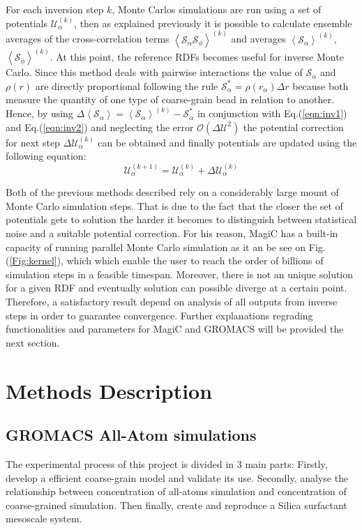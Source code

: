 \documentclass[10pt,a4paper,twoside]{article}
\begin{document}
For each inversion step $k$, Monte Carlos simulations are run using a set of potentials $\mathcal{U}_{\alpha}^{(k)}$, then as explained previously it is possible to calculate ensemble averages of the cross-correlation terms ${\left\langle\mathcal{S}_\alpha\mathcal{S}_\phi\right\rangle}^{(k)}$ and averages $\left\langle\mathcal{S}_\alpha\right\rangle^{(k)}$, $\left\langle\mathcal{S}_\phi\right\rangle^{(k)}$. At this point, the reference RDFs becomes useful for inverse Monte Carlo. Since this method deals with pairwise interactions the value of $\mathcal{S}_\alpha$ and $\rho(r)$ are directly proportional following the rule $\mathcal{S}_\alpha^{*}= \rho(r_\alpha)\Delta r $ \cite{magic} because both measure the quantity of one type of coarse-grain bead in relation to another. Hence, by using $\Delta\left\langle\mathcal{S}_\alpha\right\rangle = \left\langle\mathcal{S}_\alpha\right\rangle^{(k)} - \mathcal{S}_\alpha^{*}$  in conjunction with Eq.(\ref{eqn:inv1}) and Eq.(\ref{eqn:inv2}) and neglecting the error $\mathcal{O}({\Delta\mathcal{U}}^2)$ the potential correction for next step $\Delta\mathcal{U}_\alpha^{(k)}$ can be obtained and finally potentials are updated using the following  equation:
 \begin{equation}
\mathcal{U}_\alpha^{(k+1)}= \mathcal{U}_\alpha^{(k)}+\Delta\mathcal{U}_\alpha^{(k)}
\label{eqn:potup}
\end{equation} 

Both of the previous methods described rely on a considerably large mount of Monte Carlo simulation steps. That is due to the fact that the closer the set of potentials gets to solution the harder it becomes to distinguish between statistical noise and a suitable potential correction. For his reason, MagiC has a built-in capacity of running parallel Monte Carlo simulation as it an be see on Fig.(\ref{Fig:kernel}), which which enable the user to reach the order of billions of simulation steps in a feasible timespan. Moreover, there is not an unique solution for a given RDF \cite{ibi} and eventually solution can possible diverge at a certain point. Therefore, a satisfactory result depend on analysis of all outputs from inverse steps in order to guarantee convergence. Further explanations regrading functionalities and parameters for MagiC and GROMACS will be provided the next section.   
 
\section{Methods Description} 
\subsection{GROMACS All-Atom simulations}
The experimental process of this project is divided in 3 main parts: Firstly, develop a efficient coarse-grain model and validate its use. Secondly, analyse the relationship between concentration  of all-atoms simulation and concentration of coarse-grained simulation. Then finally, create and reproduce a Silica surfactant mesoscale system. 
\end{document}
